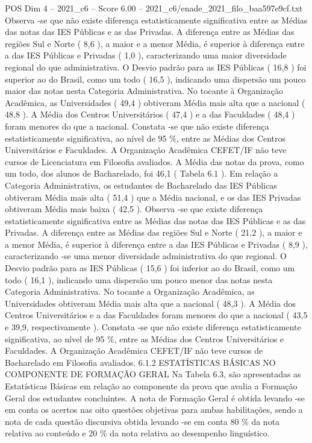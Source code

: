 \begin{textsample}{POS Dim 4 – 2021\_c6 – Score 6.00 – 2021\_c6/enade\_2021\_filo\_baa597e9cf.txt}
Observa -se que não existe diferença estatisticamente significativa entre as Médias das notas das IES Públicas e as das Privadas.
A diferença entre as Médias das regiões Sul e Norte ( 8,6 ), a maior e a menor Média, é superior à diferença entre a das IES Públicas e Privadas ( 1,0 ), caracterizando uma maior diversidade regional do que administrativa.
O Desvio padrão para as IES Públicas ( 16,8 ) foi superior ao do Brasil, como um todo ( 16,5 ), indicando uma dispersão um pouco maior das notas nesta Categoria Administrativa.
No tocante à Organização Acadêmica, as Universidades ( 49,4 ) obtiveram Média mais alta que a nacional ( 48,8 ).
A Média dos Centros Universitários ( 47,4 ) e a das Faculdades ( 48,4 ) foram menores do que a nacional.
Constata -se que não existe diferença estatisticamente significativa, ao nível de 95 \%, entre as Médias dos Centros Universitários e Faculdades.
A Organização Acadêmica CEFET/IF não teve cursos de Licenciatura em Filosofia avaliados.
A Média das notas da prova, como um todo, dos alunos de Bacharelado, foi 46,1 ( Tabela 6.1 ).
Em relação a Categoria Administrativa, os estudantes de Bacharelado das IES Públicas obtiveram Média mais alta ( 51,4 ) que a Média nacional, e os das IES Privadas obtiveram Média mais baixa ( 42,5 ).
Observa -se que existe diferença estatisticamente significativa entre as Médias das notas das IES Públicas e as das Privadas.
A diferença entre as Médias das regiões Sul e Norte ( 21,2 ), a maior e a menor Média, é superior à diferença entre a das IES Públicas e Privadas ( 8,9 ), caracterizando -se uma menor diversidade administrativa do que regional.
O Desvio padrão para as IES Públicas ( 15,6 ) foi inferior ao do Brasil, como um todo ( 16,1 ), indicando uma dispersão um pouco menor das notas nesta Categoria Administrativa.
No tocante a Organização Acadêmica, as Universidades obtiveram Média mais alta que a nacional ( 48,3 ).
A Média dos Centros Universitários e a das Faculdades foram menores do que a nacional ( 43,5 e 39,9, respectivamente ).
Constata -se que não existe diferença estatisticamente significativa, ao nível de 95 \%, entre as Médias dos Centros Universitários e Faculdades.
A Organização Acadêmica CEFET/IF não teve cursos de Bacharelado em Filosofia avaliados. 6.1.2 ESTATÍSTICAS BÁSICAS NO COMPONENTE DE FORMAÇÃO GERAL Na Tabela 6.3, são apresentadas as Estatísticas Básicas em relação ao componente da prova que avalia a Formação Geral dos estudantes concluintes.
A nota de Formação Geral é obtida levando -se em conta os acertos nas oito questões objetivas para ambas habilitações, sendo a nota de cada questão discursiva obtida levando -se em conta 80 \% da nota relativa ao conteúdo e 20 \% da nota relativa ao desempenho linguístico.

\end{textsample}
